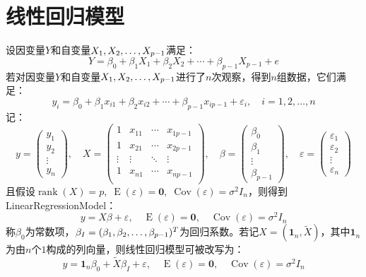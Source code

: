 \section{线性回归模型}
\begin{definition}\label{model:LinearRegressionModel}
	设因变量$Y$和自变量$X_1, X_2, \dots, X_{p-1}$满足：
	\begin{equation*}
		Y=\beta_0+\beta_1X_1+\beta_2X_2+\cdots+\beta_{p-1}X_{p-1}+e
	\end{equation*}
	若对因变量$Y$和自变量$X_1, X_2, \dots, X_{p-1}$进行了$n$次观察，得到$n$组数据，它们满足：
	\begin{equation*}
		y_i=\beta_0+\beta_1x_{i1}+\beta_2x_{i2}+\cdots+\beta_{p-1}x_{ip-1}+\varepsilon_i,\quad i=1,2,\dots,n
	\end{equation*}
	记：
	\begin{equation*}
		y=
		\begin{pmatrix}
			y_1 \\
			y_2 \\
			\vdots \\
			y_n
		\end{pmatrix},\quad
		X=
		\begin{pmatrix}
			1 & x_{11} & \cdots & x_{1p-1} \\
			1 & x_{21} & \cdots & x_{2p-1} \\
			\vdots & \vdots & \ddots & \vdots \\
			1 & x_{n1} & \cdots & x_{np-1} \\
		\end{pmatrix},\quad
		\beta=
		\begin{pmatrix}
			\beta_0 \\
			\beta_1 \\
			\vdots \\
			\beta_{p-1}
		\end{pmatrix},\quad
		\varepsilon=
		\begin{pmatrix}
			\varepsilon_1 \\
			\varepsilon_2 \\
			\vdots \\
			\varepsilon_n
		\end{pmatrix}
	\end{equation*}
	且假设$\operatorname{rank}(X)=p,\;\operatorname{E}(\varepsilon)=\mathbf{0},\;\operatorname{Cov}(\varepsilon)=\sigma^2I_n$，则得到\gls{LinearRegressionModel}：
	\begin{equation*}
		y=X\beta+\varepsilon,\quad\operatorname{E}(\varepsilon)=\mathbf{0},\quad\operatorname{Cov}(\varepsilon)=\sigma^2I_n
	\end{equation*}
	称$\beta_0$为常数项，$\beta_I=(\beta_1, \beta_2, \dots, \beta_{p-1})^T$为回归系数。若记$X=(\mathbf{1}_n,\tilde{X})$，其中$\mathbf{1}_n$为由$n$个$1$构成的列向量，则线性回归模型可被改写为：
	\begin{equation*}
		y=\mathbf{1}_n\beta_0+\tilde{X}\beta_I+\varepsilon,\quad\operatorname{E}(\varepsilon)=\mathbf{0},\quad\operatorname{Cov}(\varepsilon)=\sigma^2I_n
	\end{equation*}
\end{definition}
